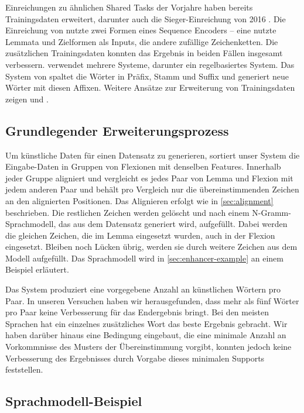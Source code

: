\documentclass[11pt,a4paper]{article}
\begin{document}
Einreichungen zu ähnlichen Shared Tasks der Vorjahre haben bereits Trainingsdaten erweitert, darunter auch die Sieger-Einreichung von 2016 \cite{kann-schutze:2016:SIGMORPHON}. Die Einreichung von \citet{bergmanis:augmenting} nutzte zwei Formen eines Sequence Encoders -- eine nutzte Lemmata und Zielformen als Inputs, die andere zufällige Zeichenketten. Die zusätzlichen Trainingsdaten konnten das Ergebnis in beiden Fällen insgesamt verbessern. \citet{kann-schutze:2017:K17-20} verwendet mehrere Systeme, darunter ein regelbasiertes System. Das System von \citet{silfverberg-EtAl:2017:K17-20} spaltet die Wörter in Präfix, Stamm und Suffix und generiert neue Wörter mit diesen Affixen. Weitere Ansätze zur Erweiterung von Trainingsdaten zeigen \cite{zhou-neubig:2017:K17-20} und \cite{nicolai-EtAl:2017:K17-20}.

\subsection{Grundlegender Erweiterungsprozess}
Um künstliche Daten für einen Datensatz zu generieren, sortiert unser System die Eingabe-Daten in Gruppen von Flexionen mit denselben Features. Innerhalb jeder Gruppe aligniert und vergleicht es jedes Paar von Lemma und Flexion mit jedem anderen Paar und behält pro Vergleich nur die übereinstimmenden Zeichen an den alignierten Positionen. Das Alignieren erfolgt wie in \autoref{sec:alignment} beschrieben. Die restlichen Zeichen werden gelöscht und nach einem N-Gramm-Sprachmodell, das aus dem Datensatz generiert wird, aufgefüllt. Dabei werden die gleichen Zeichen, die im Lemma eingesetzt wurden, auch in der Flexion eingesetzt. Bleiben noch Lücken übrig, werden sie durch weitere Zeichen aus dem Modell aufgefüllt. Das Sprachmodell wird in \autoref{sec:enhancer-example} an einem Beispiel erläutert.

Das System produziert eine vorgegebene Anzahl an künstlichen Wörtern pro Paar. In unseren Versuchen haben wir herausgefunden, dass mehr als fünf Wörter pro Paar keine Verbesserung für das Endergebnis bringt. Bei den meisten Sprachen hat ein einzelnes zusätzliches Wort das beste Ergebnis gebracht. Wir haben darüber hinaus eine Bedingung eingebaut, die eine minimale Anzahl an Vorkommnisse des Musters der Übereinstimmung vorgibt, konnten jedoch keine Verbesserung des Ergebnisses durch Vorgabe dieses minimalen Supports feststellen.

\subsection{Sprachmodell-Beispiel}
\label{sec:enhancer-example}
\end{document}

